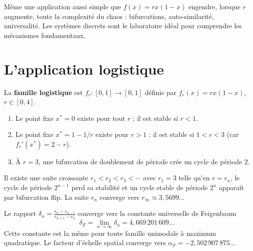 \begin{intuition}
M\^eme une application aussi simple que $f(x) = rx(1-x)$ engendre, lorsque
$r$ augmente, toute la complexit\'e du chaos : bifurcations, auto-similarit\'e,
universalit\'e. Les syst\`emes discrets sont le laboratoire id\'eal pour
comprendre les m\'ecanismes fondamentaux.
\end{intuition}

\section{L'application logistique}

\begin{definition}
La \textbf{famille logistique} est $f_r : [0,1] \to [0,1]$ d\'efinie par
$f_r(x) = rx(1-x)$, $r \in [0, 4]$.
\end{definition}

\begin{proposition}
\begin{enumerate}
    \item Le point fixe $x^* = 0$ existe pour tout $r$ ; il est stable si $r < 1$.
    \item Le point fixe $x^* = 1 - 1/r$ existe pour $r > 1$ ; il est stable si
    $1 < r < 3$ (car $f_r'(x^*) = 2 - r$).
    \item \`A $r = 3$, une bifurcation de doublement de p\'eriode cr\'ee un
    cycle de p\'eriode 2.
\end{enumerate}
\end{proposition}

\begin{theoreme}
Il existe une suite croissante $r_1 < r_2 < r_3 < \cdots$ avec
$r_1 = 3$ telle qu'en $r = r_n$, le cycle de p\'eriode $2^{n-1}$ perd sa
stabilit\'e et un cycle stable de p\'eriode $2^n$ appara\^it par bifurcation
flip. La suite $r_n$ converge vers $r_\infty \approx 3{,}5699\ldots$
\end{theoreme}

\begin{theoreme}
Le rapport $\delta_n = \frac{r_n - r_{n-1}}{r_{n+1} - r_n}$ converge vers
la constante universelle de Feigenbaum
\[
    \delta_F = \lim_{n \to \infty} \delta_n = 4{,}669\,201\,609\ldots
\]
Cette constante est la m\^eme pour toute famille unimodale \`a maximum
quadratique. Le facteur d'\'echelle spatial converge vers
$\alpha_F = -2{,}502\,907\,875\ldots$
\end{theoreme}

